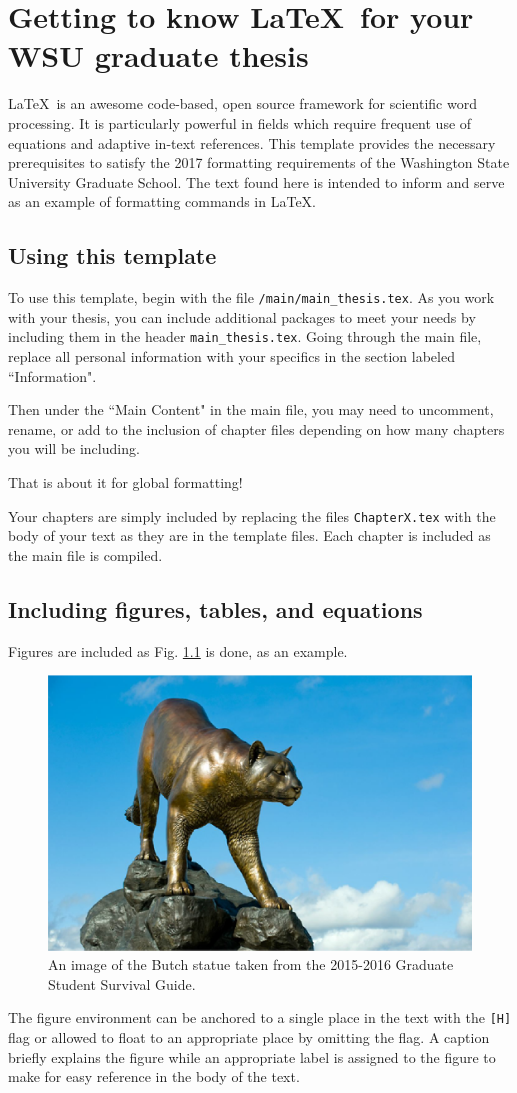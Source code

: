 \chapter{Getting to know \LaTeX\ for your WSU graduate thesis}

\LaTeX\ is an awesome code-based, open source framework for scientific word processing. It is particularly powerful in fields which require frequent use of equations and adaptive in-text references. This template provides the necessary prerequisites to satisfy the 2017 formatting requirements of the Washington State University Graduate School. The text found here is intended to inform and serve as an example of formatting commands in \LaTeX.

\section{Using this template}

To use this template, begin with the file \verb|/main/main_thesis.tex|. As you work with your thesis, you can include additional packages to meet your needs by including them in the header \verb|main_thesis.tex|. Going through the main file, replace all personal information with your specifics in the section labeled ``Information".

Then under the ``Main Content" in the main file, you may need to uncomment, rename, or add to the inclusion of chapter files depending on how many chapters you will be including.

That is about it for global formatting!

Your chapters are simply included by replacing the files \verb|ChapterX.tex| with the body of your text as they are in the template files. Each chapter is included as the main file is compiled.

\section{Including figures, tables, and equations}

Figures are included as Fig. \ref{fig:butch} is done, as an example.
\begin{figure}[H] %
    \centering
    \includegraphics[width=0.4\linewidth]{./../Figures/butch}
    \caption{An image of the Butch statue taken from the 2015-2016 Graduate Student Survival Guide.}
    \label{fig:butch}
\end{figure}
The figure environment can be anchored to a single place in the text with the \verb|[H]| flag or allowed to float to an appropriate place by omitting the flag. A caption briefly explains the figure while an appropriate label is assigned to the figure to make for easy reference in the body of the text.

